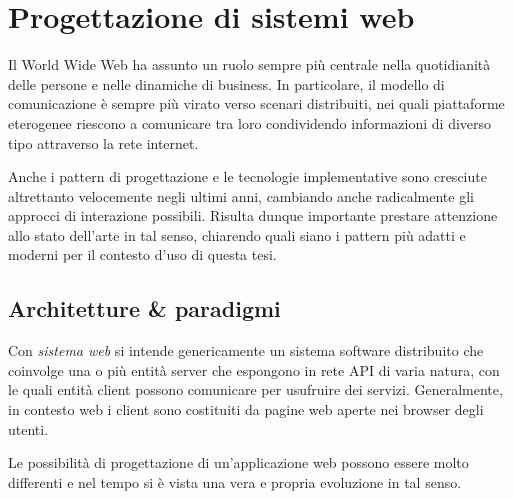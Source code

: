 \chapter{Progettazione di sistemi web}\label{ch:web}
  Il World Wide Web ha assunto un ruolo sempre più centrale nella quotidianità delle persone e nelle dinamiche di business.
  In particolare, il modello di comunicazione è sempre più virato verso scenari distribuiti,
  nei quali piattaforme eterogenee riescono a comunicare tra loro condividendo informazioni di diverso tipo attraverso la rete internet.

  Anche i pattern di progettazione e le tecnologie implementative sono cresciute altrettanto velocemente negli ultimi anni, cambiando anche radicalmente gli approcci di interazione possibili.
  Risulta dunque importante prestare attenzione allo stato dell'arte in tal senso, chiarendo quali siano i pattern più adatti e moderni per il contesto d'uso di questa tesi.

  \section{Architetture \& paradigmi}\label{sec:web-architecture}

  Con \emph{sistema web} si intende genericamente un sistema software distribuito che coinvolge una o più entità server che espongono in rete API di varia natura, con le quali entità client possono comunicare per usufruire dei servizi.
  Generalmente, in contesto web i client sono costituiti da pagine web aperte nei browser degli utenti.

  Le possibilità di progettazione di un'applicazione web possono essere molto differenti e nel tempo si è vista una vera e propria evoluzione in tal senso.

